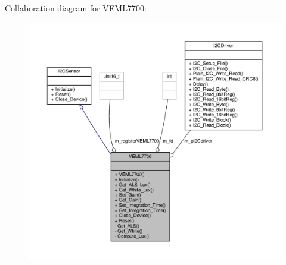 Collaboration diagram for V\+E\+M\+L7700\+:\nopagebreak
\begin{figure}[H]
\begin{center}
\leavevmode
\includegraphics[width=350pt]{classVEML7700__coll__graph}
\end{center}
\end{figure}
